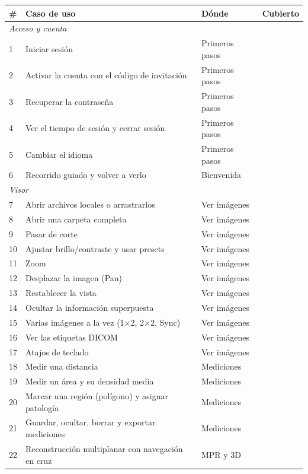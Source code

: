 \documentclass[11pt,a4paper]{report}
\begin{document}
{\small
{}
\begin{longtable}{p{0.6cm}p{8.6cm}p{4.2cm}p{1.4cm}}
  \toprule
  \textbf{\#} & \textbf{Caso de uso} & \textbf{Dónde} & \textbf{Cubierto} \\
  \midrule
  \endhead
  \multicolumn{4}{l}{\textit{Acceso y cuenta}} \\
  1 & Iniciar sesión & Primeros pasos & \si \\
  2 & Activar la cuenta con el código de invitación & Primeros pasos & \si \\
  3 & Recuperar la contraseña & Primeros pasos & \si \\
  4 & Ver el tiempo de sesión y cerrar sesión & Primeros pasos & \si \\
  5 & Cambiar el idioma & Primeros pasos & \si \\
  6 & Recorrido guiado y volver a verlo & Bienvenida & \si \\
  \multicolumn{4}{l}{\textit{Visor}} \\
  7 & Abrir archivos locales o arrastrarlos & Ver imágenes & \si \\
  8 & Abrir una carpeta completa & Ver imágenes & \si \\
  9 & Pasar de corte & Ver imágenes & \si \\
  10 & Ajustar brillo/contraste y usar presets & Ver imágenes & \si \\
  11 & Zoom & Ver imágenes & \si \\
  12 & Desplazar la imagen (Pan) & Ver imágenes & \si \\
  13 & Restablecer la vista & Ver imágenes & \si \\
  14 & Ocultar la información superpuesta & Ver imágenes & \si \\
  15 & Varias imágenes a la vez (1×2, 2×2, Sync) & Ver imágenes & \si \\
  16 & Ver las etiquetas DICOM & Ver imágenes & \si \\
  17 & Atajos de teclado & Ver imágenes & \si \\
  18 & Medir una distancia & Mediciones & \si \\
  19 & Medir un área y su densidad media & Mediciones & \si \\
  20 & Marcar una región (polígono) y asignar patología & Mediciones & \si \\
  21 & Guardar, ocultar, borrar y exportar mediciones & Mediciones & \si \\
  22 & Reconstrucción multiplanar con navegación en cruz & MPR y 3D & \si \\

\end{longtable}}
\end{document}
